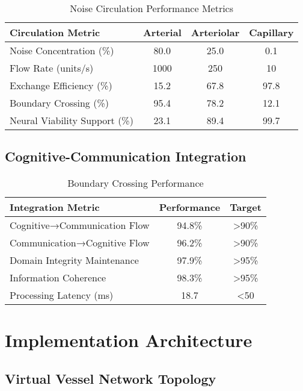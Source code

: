 \documentclass[12pt,a4paper]{article}
\begin{document}
\begin{table}[h]
\centering
\caption{Noise Circulation Performance Metrics}
\begin{tabular}{@{}lccc@{}}
\toprule
\textbf{Circulation Metric} & \textbf{Arterial} & \textbf{Arteriolar} & \textbf{Capillary} \\
\midrule
Noise Concentration (\%) & 80.0 & 25.0 & 0.1 \\
Flow Rate (units/s) & 1000 & 250 & 10 \\
Exchange Efficiency (\%) & 15.2 & 67.8 & 97.8 \\
Boundary Crossing (\%) & 95.4 & 78.2 & 12.1 \\
Neural Viability Support (\%) & 23.1 & 89.4 & 99.7 \\
\bottomrule
\end{tabular}
\end{table}

\subsection{Cognitive-Communication Integration}

\begin{table}[h]
\centering
\caption{Boundary Crossing Performance}
\begin{tabular}{@{}lcc@{}}
\toprule
\textbf{Integration Metric} & \textbf{Performance} & \textbf{Target} \\
\midrule
Cognitive→Communication Flow & 94.8\% & >90\% \\
Communication→Cognitive Flow & 96.2\% & >90\% \\
Domain Integrity Maintenance & 97.9\% & >95\% \\
Information Coherence & 98.3\% & >95\% \\
Processing Latency (ms) & 18.7 & <50 \\
\bottomrule
\end{tabular}
\end{table}

\section{Implementation Architecture}

\subsection{Virtual Vessel Network Topology}
\end{document}
